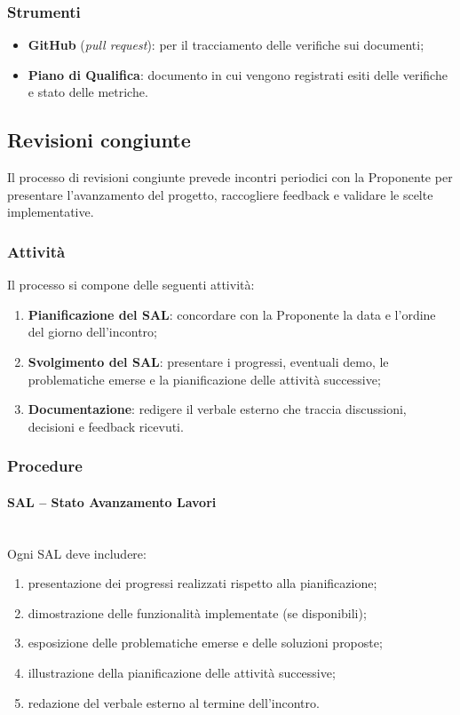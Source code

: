 \documentclass[10pt, letterpaper]{article}
\newcommand{\trisubsection}[1]{\paragraph{#1}\mbox{}\\}
\begin{document}
\subsubsection{Strumenti}
\begin{itemize}
    \item \textbf{GitHub} (\textit{pull request}): per il tracciamento delle verifiche sui documenti;
    \item \textbf{Piano di Qualifica}: documento in cui vengono registrati esiti delle verifiche e stato delle metriche.
\end{itemize}


\subsection{Revisioni congiunte}
Il processo di revisioni congiunte prevede incontri periodici con la Proponente per presentare l'avanzamento del progetto, raccogliere feedback e validare le scelte implementative.

\subsubsection{Attività}
Il processo si compone delle seguenti attività:
\begin{enumerate}
    \item \textbf{Pianificazione del SAL}: concordare con la Proponente la data e l'ordine del giorno dell'incontro;
    \item \textbf{Svolgimento del SAL}: presentare i progressi, eventuali demo, le problematiche emerse e la pianificazione delle attività successive;
    \item \textbf{Documentazione}: redigere il verbale esterno che traccia discussioni, decisioni e feedback ricevuti.
\end{enumerate}

\subsubsection{Procedure}

\trisubsection{SAL -- Stato Avanzamento Lavori}
Ogni SAL deve includere:
\begin{enumerate}
    \item presentazione dei progressi realizzati rispetto alla pianificazione;
    \item dimostrazione delle funzionalità implementate (se disponibili);
    \item esposizione delle problematiche emerse e delle soluzioni proposte;
    \item illustrazione della pianificazione delle attività successive;
    \item redazione del verbale esterno al termine dell'incontro.
\end{enumerate}
\end{document}
